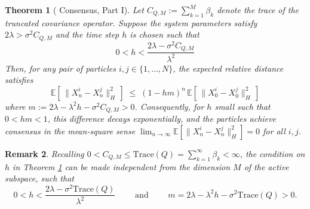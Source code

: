 \documentclass[12pt]{amsart}
\numberwithin{equation}{section}
\newtheorem{theorem}{Theorem}[section]
\newtheorem{remark}[theorem]{Remark}
\begin{document}
\begin{theorem}[%
Consensus, Part I]\label{thm:strong_consensus}
Let $C_{Q,M} := \sum_{k=1}^M \beta_k$ denote the trace of the truncated covariance operator. Suppose the system parameters satisfy $2\lambda > \sigma^2 C_{Q,M}$ and the time step $h$ is chosen such that 
\[
0 < h < \frac{2\lambda - \sigma^2 C_{Q,M}}{\lambda^2} %
\]
Then, for any pair of particles $i, j \in \{1, \dots, N\}$, the expected relative distance satisfies %
\begin{equation*}
    \mathbb{E}[\,\|X_n^i - X_n^j\|_H^2\,] \;\le\; (1 - hm)^n\, \mathbb{E}[\,\|X_0^i - X_0^j\|_H^2\,]
\end{equation*}
where $m := 2\lambda - \lambda^2 h - \sigma^2 C_{Q,M} > 0$. Consequently, for $h$ small such that $0<hm<1$, this difference decays exponentially, and
the particles achieve consensus in the mean-square sense $\lim_{n \to \infty} \mathbb{E}[\|X_n^i - X_n^j\|_H^2] = 0$ for all $i,j$.
\end{theorem}

\begin{remark}\label{rmk:independent of M}
Recalling $0< C_{Q,M}\leq \mathrm{Trace}(Q)=\sum_{k=1}^\infty \beta_k<\infty$, the condition on $h$ in Theorem \ref{thm:strong_consensus} can be made independent from the dimension $M$ of the active subspace, such that
\[
0< h < \frac{2\lambda - \sigma^2 \mathrm{Trace}(Q)}{\lambda^2}
\qquad \text{ and } \qquad 
m = 2\lambda - \lambda^2 h - \sigma^2 \mathrm{Trace}(Q) > 0.
\]
\end{remark}
\end{document}
